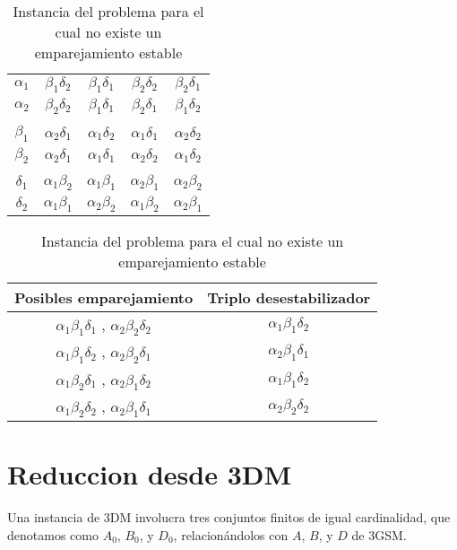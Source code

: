 \documentclass{article}
\begin{document}
\begin{table}
    \centering
    \begin{tabular}{c|cccc}
    $\alpha_1$&$\beta_1\delta_2$&$\beta_1\delta_1$&$\beta_2\delta_2$&$\beta_2\delta_1$\\
    $\alpha_2$&$\beta_2\delta_2$&$\beta_1\delta_1$&$\beta_2\delta_1$&$\beta_1\delta_2$\\
    \hline\\
    $\beta_1$& $\alpha_2 \delta_1$ & $\alpha_1 \delta_2$ & $\alpha_1\delta_1$& $\alpha_2 \delta_2$\\
    $\beta_2$& $\alpha_2 \delta_1$ & $\alpha_1 \delta_1$ & $\alpha_2\delta_2$& $\alpha_1 \delta_2$\\
    \hline\\
    $\delta_1$ & $\alpha_1 \beta_2$ & $\alpha_1 \beta_1$ & $\alpha_2 \beta_1$ & $\alpha_2 \beta_2$\\
    $\delta_2$ & $\alpha_1 \beta_1$ & $\alpha_2 \beta_2$ & $\alpha_1 \beta_2$ & $\alpha_2 \beta_1$\\

    \end{tabular}
    \linebreak
    \begin{tabular}{|c|c|}
        \hline
        Posibles emparejamiento & Triplo desestabilizador\\
        \hline
        {$\alpha_1 \beta_1 \delta_1$ , $\alpha_2 \beta_2 \delta_2$} & $\alpha_1 \beta_1 \delta_2$\\
        {$\alpha_1 \beta_1 \delta_2$ , $\alpha_2 \beta_2 \delta_1$} & $\alpha_2 \beta_1 \delta_1$\\
        {$\alpha_1 \beta_2 \delta_1$ , $\alpha_2 \beta_1 \delta_2$} & $\alpha_1 \beta_1 \delta_2$\\
        {$\alpha_1 \beta_2 \delta_2$ , $\alpha_2 \beta_1 \delta_1$} & $\alpha_2 \beta_2 \delta_2$\\
        \hline
    \end{tabular}
    \caption{Instancia del problema para el cual no existe un emparejamiento estable}
\end{table}



\section*{Reduccion desde 3DM}

Una instancia de 3DM involucra tres conjuntos finitos de igual cardinalidad, que denotamos como $A_0$, $B_0$, y $D_0$, relacionándolos con $A$, $B$, y $D$ de 3GSM. 
\end{document}
